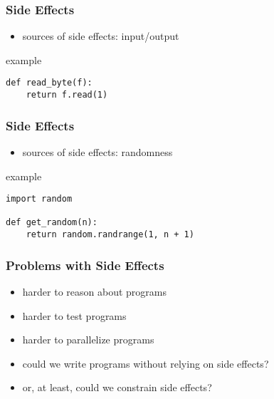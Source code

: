 \documentclass[dvipsnames]{beamer}
\theoremstyle{plain}
\begin{document}
\begin{frame}[fragile]
  \frametitle{Side Effects}

  \begin{itemize}
    \item sources of side effects: input/output
  \end{itemize}

  \begin{exampleblock}{example}
    \begin{lstlisting}
def read_byte(f):
    return f.read(1)
    \end{lstlisting}
  \end{exampleblock}
\end{frame}

\begin{frame}[fragile]
  \frametitle{Side Effects}

  \begin{itemize}
    \item sources of side effects: randomness
  \end{itemize}

  \begin{exampleblock}{example}
    \begin{lstlisting}
import random

def get_random(n):
    return random.randrange(1, n + 1)
    \end{lstlisting}
  \end{exampleblock}
\end{frame}

\begin{frame}
  \frametitle{Problems with Side Effects}

  \begin{itemize}
    \item harder to reason about programs
    \item harder to test programs
    \item harder to parallelize programs

    \pause
    \bigskip
    \item could we write programs without relying on side effects?
    \item or, at least, could we constrain side effects?
  \end{itemize}
\end{frame}
\end{document}

